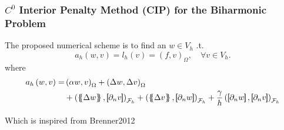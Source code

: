 \begin{frame}
\frametitle{ $C^0$ Interior Penalty Method (CIP) for the Biharmonic Problem }

\begin{block}{}
The proposed numerical scheme is to find an  $w \in V_{h}$ .t.
\begin{equation*}
\label{eq:CP_A_F}
a_{h}( w, v )   = l_{h}( v) = ( f,v)_{\Omega } , \quad \forall v \in V_{h}  .
\end{equation*}
where
\begin{equation*}
\begin{split}
a_{h} \left( w, v \right)   =&
    \left( \alpha  w, v \right) _{\Omega }   +  \left( \Delta  w, \Delta v \right) _{\Omega } \\
 & +
  \left( \mean{  \Delta  w }, \jump{ \partial _{n }v} \right)_{\mathcal{F}_{h}}  +
 \left( \mean{ \Delta  v }, \jump{ \partial _{n}w }      \right)_{\mathcal{F}_{h}}  + \frac{\gamma }{h}  \left( \jump{ \partial _{n} w}, \jump{ \partial _{n} v   }   \right)_{\mathcal{F}_{h}}
\end{split}
\end{equation*}

Which is inspired from Brenner2012 \footnotemark[1]
\end{block}


\end{frame}



